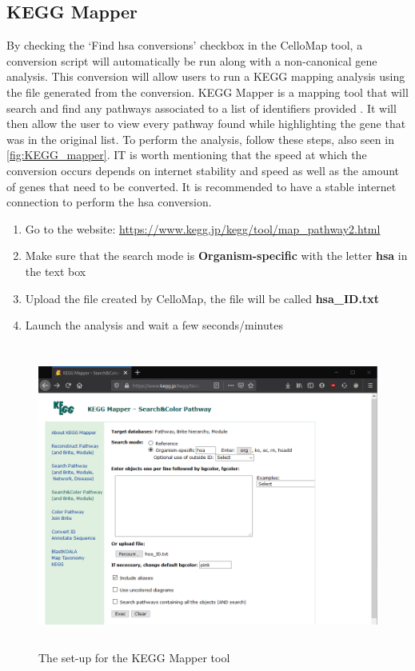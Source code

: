 \documentclass[11pt]{article}
\begin{document}
\subsection{KEGG Mapper \label{KEGG Map}}
By checking the `Find \acrshort{hsa} conversions' checkbox in the CelloMap tool, a conversion script will automatically be run along with a non-canonical gene analysis. This conversion will allow users to run a \acrshort{KEGG} mapping analysis using the file generated from the conversion.
\acrshort{KEGG} Mapper is a mapping tool that will search and find any pathways associated to a list of identifiers provided \cite{kanehisa2019kegg}. It will then allow the user to view every pathway found while highlighting the gene that was in the original list.
To perform the analysis, follow these steps, also seen in \autoref{fig:KEGG_mapper}.
IT is worth mentioning that the speed at which the conversion occurs depends on internet stability and speed as well as the amount of genes that need to be converted. It is recommended to have a stable internet connection to perform the \acrshort{hsa} conversion.
\begin{enumerate}
\item Go to the website: \url{https://www.kegg.jp/kegg/tool/map_pathway2.html}
\item Make sure that the search mode is \textbf{Organism-specific} with the letter \textbf{\acrshort{hsa}} in the text box
\item Upload the file created by CelloMap, the file will be called \textbf{\acrshort{hsa}\_ID.txt} 
\item Launch the analysis and wait a few seconds/minutes
\end{enumerate}

\begin{figure}[h!]
\centering
\includegraphics[width=15cm,height=10cm,keepaspectratio]{KEGG_Mapper.png}
\caption{The set-up for the \acrshort{KEGG} Mapper tool}
\label{fig:KEGG_mapper}
\end{figure}
\end{document}
